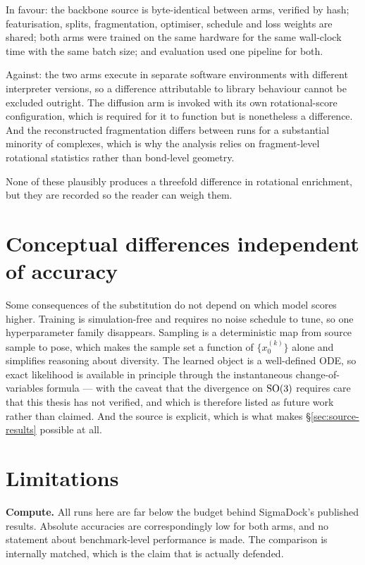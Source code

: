In favour: the backbone source is byte-identical between arms, verified by
hash; featurisation, splits, fragmentation, optimiser, schedule and loss
weights are shared; both arms were trained on the same hardware for the same
wall-clock time with the same batch size; and evaluation used one pipeline for
both.

Against: the two arms execute in separate software environments with different
interpreter versions, so a difference attributable to library behaviour cannot
be excluded outright. The diffusion arm is invoked with its own
rotational-score configuration, which is required for it to function but is
nonetheless a difference. And the reconstructed fragmentation differs between
runs for a substantial minority of complexes, which is why the analysis relies
on fragment-level rotational statistics rather than bond-level geometry.

None of these plausibly produces a threefold difference in rotational
enrichment, but they are recorded so the reader can weigh them.

\section{Conceptual differences independent of accuracy}

Some consequences of the substitution do not depend on which model scores
higher. Training is simulation-free and requires no noise schedule to tune, so
one hyperparameter family disappears. Sampling is a deterministic map from
source sample to pose, which makes the sample set a function of $\{x_0^{(k)}\}$
alone and simplifies reasoning about diversity. The learned object is a
well-defined ODE, so exact likelihood is available in principle through the
instantaneous change-of-variables formula --- with the caveat that the
divergence on $\mathrm{SO}(3)$ requires care that this thesis has not verified, and
which is therefore listed as future work rather than claimed. And the source
is explicit, which is what makes \S\ref{sec:source-results} possible at all.

\section{Limitations}
\label{sec:limits}

\textbf{Compute.} All runs here are far below the budget behind SigmaDock's
published results. Absolute accuracies are correspondingly low for both arms,
and no statement about benchmark-level performance is made. The comparison is
internally matched, which is the claim that is actually defended.

